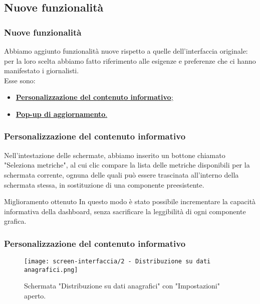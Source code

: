 \subsection{Nuove funzionalità}

\begin{frame}
    \frametitle{Nuove funzionalità}
    Abbiamo aggiunto funzionalità nuove rispetto a quelle dell'interfaccia originale: per la loro scelta abbiamo fatto riferimento alle esigenze e preferenze che ci hanno manifestato i giornalisti.\\
    Esse sono:
    \begin{itemize}
        \item \hyperlink{f:custom}{\textbf{Personalizzazione del contenuto informativo};}
        \item \hyperlink{f:pop}{\textbf{Pop-up di aggiornamento}.}        
    \end{itemize}

\end{frame}

\begin{frame}
    \frametitle{Personalizzazione del contenuto informativo}
    \label{f:custom}
    Nell'intestazione delle schermate, abbiamo inserito un bottone chiamato "Seleziona metriche", al cui clic compare la lista delle metriche disponibili per la schermata corrente, ognuna delle quali può essere trascinata all'interno della schermata stessa, in sostituzione di una componente preesistente. 
    \vspace{-30pt}
    \begin{alertblock}{Miglioramento ottenuto}
        In questo modo è stato possibile incrementare la capacità informativa della dashboard, senza sacrificare la leggibilità di ogni componente grafica.        
    \end{alertblock}

\end{frame}

\begin{frame}
    \frametitle{Personalizzazione del contenuto informativo}
    \begin{figure}
        \centering
        \texttt{[image: screen-interfaccia/2 - Distribuzione su dati anagrafici.png]}
        \caption{Schermata "Distribuzione su dati anagrafici" con "Impostazioni" aperto.}
    \end{figure}

\end{frame}

